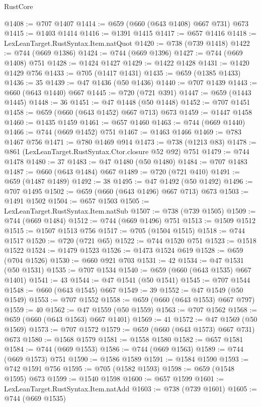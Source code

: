 \begin{lexlean}{RustCore}
\begin{coremodule}
@1408 := @707 @1407
@1414 := @659 (@660 (@643 @1408) @667 @731) @673
@1415 := @1403 @1414
@1416 := @1391 @1415
@1417 := @657 @1416
@1418 := LexLeanTarget.RustSyntax.Item.natQuot
@1420 := @738 (@739 @1418)
@1422 := @744 (@669 @1386)
@1424 := @744 (@669 @1396)
@1427 := @744 (@669 @1408) @751
@1428 := @1424 @1427
@1429 := @1422 @1428
@1431 := @1420 @1429 @756
@1433 := @705 (@1417 @1431)
@1435 := @659 (@1385 @1433)
@1436 := 35
@1439 := @47 @1436 (@50 @1436)
@1440 := @707 @1439
@1443 := @660 (@643 @1440) @667
@1445 := @720 (@721 @391)
@1447 := @659 (@1443 @1445)
@1448 := 36
@1451 := @47 @1448 (@50 @1448)
@1452 := @707 @1451
@1458 := @659 (@660 (@643 @1452) @667 @713) @673
@1459 := @1447 @1458
@1460 := @1435 @1459
@1461 := @657 @1460
@1463 := @744 (@669 @1440)
@1466 := @744 (@669 @1452) @751
@1467 := @1463 @1466
@1469 := @783 @1467 @756
@1471 := @780 @1469 @914
@1473 := @738 (@1213 @83)
@1478 := @861 (LexLeanTarget.RustSyntax.Ctor.closure @52 @92) @751
@1479 := @744 @1478
@1480 := 37
@1483 := @47 @1480 (@50 @1480)
@1484 := @707 @1483
@1487 := @660 (@643 @1484) @667
@1489 := @720 (@721 @410)
@1491 := @659 (@1487 @1489)
@1492 := 38
@1495 := @47 @1492 (@50 @1492)
@1496 := @707 @1495
@1502 := @659 (@660 (@643 @1496) @667 @713) @673
@1503 := @1491 @1502
@1504 := @657 @1503
@1505 := LexLeanTarget.RustSyntax.Item.natSub
@1507 := @738 (@739 @1505)
@1509 := @744 (@669 @1484)
@1512 := @744 (@669 @1496) @751
@1513 := @1509 @1512
@1515 := @1507 @1513 @756
@1517 := @705 (@1504 @1515)
@1518 := @744 @1517
@1520 := @720 (@721 @65)
@1522 := @744 @1520 @751
@1523 := @1518 @1522
@1524 := @1479 @1523
@1526 := @1473 @1524 @619
@1528 := @659 (@704 @1526)
@1530 := @660 @921 @703
@1531 := 42
@1534 := @47 @1531 (@50 @1531)
@1535 := @707 @1534
@1540 := @659 (@660 (@643 @1535) @667 @1401)
@1541 := 43
@1544 := @47 @1541 (@50 @1541)
@1545 := @707 @1544
@1548 := @660 (@643 @1545) @667
@1549 := 39
@1552 := @47 @1549 (@50 @1549)
@1553 := @707 @1552
@1558 := @659 (@660 (@643 @1553) @667 @797)
@1559 := 40
@1562 := @47 @1559 (@50 @1559)
@1563 := @707 @1562
@1568 := @659 (@660 (@643 @1563) @667 @1401)
@1569 := 41
@1572 := @47 @1569 (@50 @1569)
@1573 := @707 @1572
@1579 := @659 (@660 (@643 @1573) @667 @731) @673
@1580 := @1568 @1579
@1581 := @1558 @1580
@1582 := @657 @1581
@1584 := @744 (@669 @1553)
@1586 := @744 (@669 @1563)
@1589 := @744 (@669 @1573) @751
@1590 := @1586 @1589
@1591 := @1584 @1590
@1593 := @742 @1591 @756
@1595 := @705 (@1582 @1593)
@1598 := @659 (@1548 @1595) @673
@1599 := @1540 @1598
@1600 := @657 @1599
@1601 := LexLeanTarget.RustSyntax.Item.natAdd
@1603 := @738 (@739 @1601)
@1605 := @744 (@669 @1535)

\end{coremodule}
\end{lexlean}

